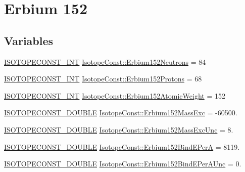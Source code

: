 \hypertarget{group___isotope_const-_erbium-_er152}{}\section{Erbium 152}
\label{group___isotope_const-_erbium-_er152}
\subsection*{Variables}
\begin{DoxyCompactItemize}
\item 
\mbox{\hyperlink{group___isotope_const-_macros_ga5f18360b3e99483a35c32d789e62621c}{I\+S\+O\+T\+O\+P\+E\+C\+O\+N\+S\+T\+\_\+\+I\+NT}} \mbox{\hyperlink{group___isotope_const-_erbium-_er152_gaba86e3677e887bbb37119656ceed2b45}{Isotope\+Const\+::\+Erbium152\+Neutrons}} = 84
\item 
\mbox{\hyperlink{group___isotope_const-_macros_ga5f18360b3e99483a35c32d789e62621c}{I\+S\+O\+T\+O\+P\+E\+C\+O\+N\+S\+T\+\_\+\+I\+NT}} \mbox{\hyperlink{group___isotope_const-_erbium-_er152_ga1f4cb5110688dc77ce727af903a2ca11}{Isotope\+Const\+::\+Erbium152\+Protons}} = 68
\item 
\mbox{\hyperlink{group___isotope_const-_macros_ga5f18360b3e99483a35c32d789e62621c}{I\+S\+O\+T\+O\+P\+E\+C\+O\+N\+S\+T\+\_\+\+I\+NT}} \mbox{\hyperlink{group___isotope_const-_erbium-_er152_ga876a4713f45dc47f8dca63a93e5901ef}{Isotope\+Const\+::\+Erbium152\+Atomic\+Weight}} = 152
\item 
\mbox{\hyperlink{group___isotope_const-_macros_ga8f45a7272ce02c0b4c65c44636ed719a}{I\+S\+O\+T\+O\+P\+E\+C\+O\+N\+S\+T\+\_\+\+D\+O\+U\+B\+LE}} \mbox{\hyperlink{group___isotope_const-_erbium-_er152_gad27997ccee657ea28ea4e16238effaf5}{Isotope\+Const\+::\+Erbium152\+Mass\+Exc}} = -\/60500.
\item 
\mbox{\hyperlink{group___isotope_const-_macros_ga8f45a7272ce02c0b4c65c44636ed719a}{I\+S\+O\+T\+O\+P\+E\+C\+O\+N\+S\+T\+\_\+\+D\+O\+U\+B\+LE}} \mbox{\hyperlink{group___isotope_const-_erbium-_er152_gaca1414075a0f0d669681da3fc8cc507f}{Isotope\+Const\+::\+Erbium152\+Mass\+Exc\+Unc}} = 8.
\item 
\mbox{\hyperlink{group___isotope_const-_macros_ga8f45a7272ce02c0b4c65c44636ed719a}{I\+S\+O\+T\+O\+P\+E\+C\+O\+N\+S\+T\+\_\+\+D\+O\+U\+B\+LE}} \mbox{\hyperlink{group___isotope_const-_erbium-_er152_ga1ed98586cf9a58576e487ccf696a3695}{Isotope\+Const\+::\+Erbium152\+Bind\+E\+PerA}} = 8119.
\item 
\mbox{\hyperlink{group___isotope_const-_macros_ga8f45a7272ce02c0b4c65c44636ed719a}{I\+S\+O\+T\+O\+P\+E\+C\+O\+N\+S\+T\+\_\+\+D\+O\+U\+B\+LE}} \mbox{\hyperlink{group___isotope_const-_erbium-_er152_ga88fa2729d9c793e99412fe0572e9a566}{Isotope\+Const\+::\+Erbium152\+Bind\+E\+Per\+A\+Unc}} = 0.

\end{DoxyCompactItemize}
